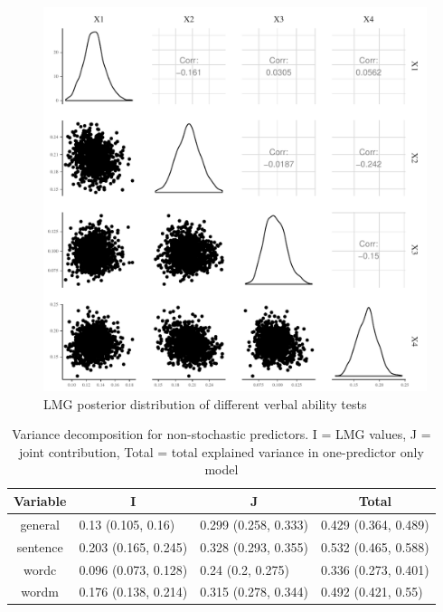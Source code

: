 \documentclass[11pt,a4paper,twoside]{book}
\makeatletter
\def\maxwidth{ %
  \ifdim\Gin@nat@width>\linewidth
    \linewidth
  \else
    \Gin@nat@width
  \fi
}
\newenvironment{knitrout}{}{} %
\makeatother
\begin{document}
\begin{knitrout}
\color{fgcolor}\begin{figure}
\includegraphics[width=\maxwidth]{figure/ch03_figempi_lmg_plot-1} \caption[LMG posterior distribution of different verbal ability tests]{LMG posterior distribution of different verbal ability tests}\label{fig:empi.lmg.plot}
\end{figure}


\end{knitrout}


\begin{table}[h]
\caption{Variance decomposition for non-stochastic predictors. I = LMG values, J = joint contribution, Total = total explained variance in one-predictor only model}
\centering
\begin{tabular}{clll}
  \toprule
  \multicolumn{1}{c}{\textbf{Variable}} & \multicolumn{1}{c}{\textbf{I}} &\multicolumn{1}{c}{\textbf{J}} & \multicolumn{1}{c}{\textbf{Total}} \\
  \hline
general & 0.13 (0.105, 0.16)  & 0.299 (0.258, 0.333)   & 0.429 (0.364, 0.489)  \\ 
sentence & 0.203 (0.165, 0.245)  & 0.328 (0.293, 0.355)   & 0.532 (0.465, 0.588)  \\ 
wordc & 0.096 (0.073, 0.128)  & 0.24 (0.2, 0.275)   & 0.336 (0.273, 0.401)  \\ 
wordm & 0.176 (0.138, 0.214)  & 0.315 (0.278, 0.344)   & 0.492 (0.421, 0.55)  \\ 
   \bottomrule
\end{tabular}
\label{tbl:empirical.ijt}
\end{table}
\end{document}
